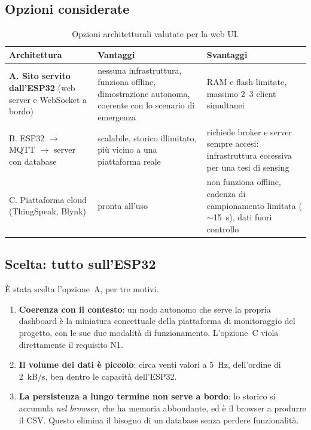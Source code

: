 \subsection{Opzioni considerate}

\begin{table}[htbp]
\centering
\caption{Opzioni architetturali valutate per la web UI.}
\label{tab:webui-opzioni}
\small
\begin{tabularx}{\textwidth}{@{}lXX@{}}
\toprule
\textbf{Architettura} & \textbf{Vantaggi} & \textbf{Svantaggi} \\
\midrule
\textbf{A. Sito servito dall'ESP32} (web server e WebSocket a bordo) &
  nessuna infrastruttura, funziona offline, dimostrazione autonoma, coerente con lo
  scenario di emergenza &
  RAM e flash limitate, massimo 2--3 client simultanei \\
B. ESP32 $\to$ MQTT $\to$ server con database &
  scalabile, storico illimitato, più vicino a una piattaforma reale &
  richiede broker e server sempre accesi: infrastruttura eccessiva per una tesi di
  sensing \\
C. Piattaforma cloud (ThingSpeak, Blynk) &
  pronta all'uso &
  non funziona offline, cadenza di campionamento limitata ($\sim$15~s), dati fuori
  controllo \\
\bottomrule
\end{tabularx}
\end{table}

\subsection{Scelta: tutto sull'ESP32}

È stata scelta l'opzione~A, per tre motivi.

\begin{enumerate}[leftmargin=1.8em,itemsep=3pt]
  \item \textbf{Coerenza con il contesto}: un nodo autonomo che serve la propria
        dashboard è la miniatura concettuale della piattaforma di monitoraggio del
        progetto, con le sue due modalità di funzionamento. L'opzione~C viola
        direttamente il requisito N1.
  \item \textbf{Il volume dei dati è piccolo}: circa venti valori a 5~Hz,
        dell'ordine di 2~kB/s, ben dentro le capacità dell'ESP32.
  \item \textbf{La persistenza a lungo termine non serve a bordo}: lo storico si
        accumula \emph{nel browser}, che ha memoria abbondante, ed è il browser a
        produrre il CSV. Questo elimina il bisogno di un database senza perdere
        funzionalità.
\end{enumerate}

